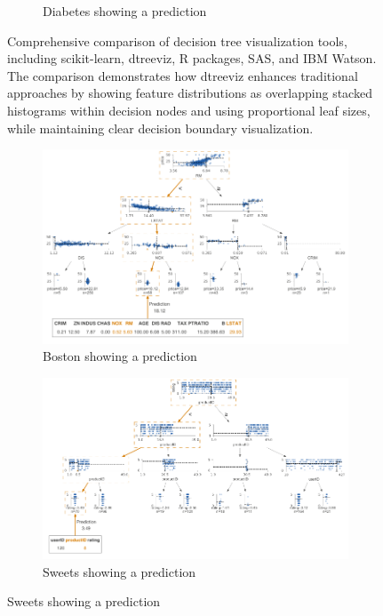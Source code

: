 \begin{figure}[p]
\begin{subfigure}{0.48\textwidth}
        \caption{Diabetes showing a prediction}
        \label{fig:tool_comparison_diabetes-TD-3-X}
    \end{subfigure}
    \caption{Comprehensive comparison of decision tree visualization tools, including scikit-learn, dtreeviz, R packages, SAS, and IBM Watson. The comparison demonstrates how dtreeviz enhances traditional approaches by showing feature distributions as overlapping stacked histograms within decision nodes and using proportional leaf sizes, while maintaining clear decision boundary visualization.}
    \label{fig:tool_comparison}
\end{figure}

\begin{figure}[p]
    \ContinuedFloat  %
    \centering
        
    \begin{subfigure}{0.48\textwidth}
        \includegraphics[width=\linewidth]{images/boston-TD-3-X.png}
        \caption{Boston showing a prediction}
        \label{fig:tool_comparison_boston-TD-3-X}
    \end{subfigure}\hfill
    \begin{subfigure}{0.48\textwidth}
        \includegraphics[width=\linewidth]{images/sweets-TD-3-X.png}
        \caption{Sweets showing a prediction}
        \label{fig:tool_comparison_sweets-TD-3-X}
    \end{subfigure}
    \vspace{0.5cm}
    

\end{figure}
